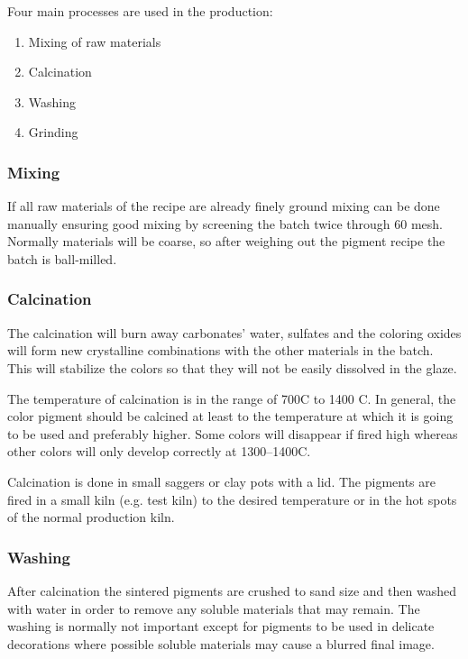 Four main processes are used in the production:
\begin{enumerate}
\item Mixing of raw materials
\item Calcination
\item Washing
\item Grinding
\end{enumerate}
\subsubsection{Mixing}
If all raw materials of the recipe are already finely ground mixing can be done 
manually ensuring good mixing by screening the batch twice through 60 mesh. 
Normally materials will be coarse, so after weighing out the pigment recipe the 
batch is ball-milled.
\subsubsection{Calcination}
The calcination will burn away carbonates' water, sulfates and the coloring 
oxides will form new crystalline combinations with the other materials in the 
batch. This will stabilize the colors so that they will not be easily dissolved 
in the glaze.

The temperature of calcination is in the range of 700\degree C to 1400\degree 
C. In general, the color pigment should be calcined at least to the temperature 
at which it is going to be used and preferably higher. Some colors will 
disappear if fired high whereas other colors will only develop correctly at 
1300\degree --1400\degree C.

Calcination is done in small saggers or clay pots with a lid. The pigments are 
fired in a small kiln (e.g. test kiln) to the desired temperature or in the hot 
spots of the normal production kiln.
\subsubsection{Washing}
After calcination the sintered pigments are crushed to sand size and then 
washed with water in order to remove any soluble materials that may remain. The 
washing is normally not important except for pigments to be used in delicate 
decorations where possible soluble materials may cause a blurred final image.
